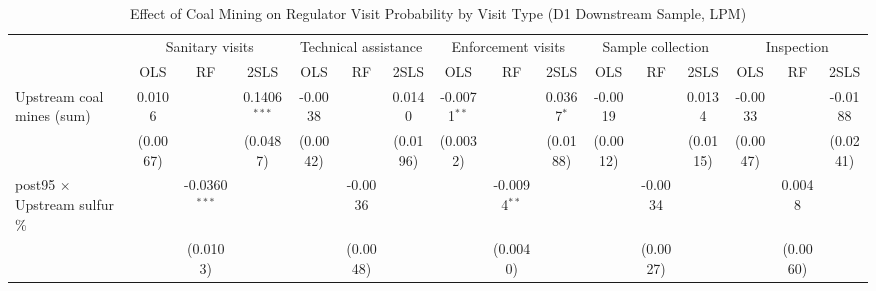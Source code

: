 
\begin{table}[htbp]
   
   \caption{\label{tab:h2_snsv_d12} Effect of Coal Mining on Regulator Visit Probability by Visit Type (D1 Downstream Sample, LPM)}
   \bigskip
   
   \centering
   
   \begin{adjustbox}{width = \textwidth, center}
      
      
      \begin{tabular}{lccccccccccccccc}
         \toprule
         
          & \multicolumn{3}{c}{Sanitary visits} & \multicolumn{3}{c}{Technical assistance} & \multicolumn{3}{c}{Enforcement visits} & \multicolumn{3}{c}{Sample collection} & \multicolumn{3}{c}{Inspection}\\
         
                                                                  & OLS           & RF              & 2SLS           & OLS           & RF            & 2SLS          & OLS            & RF             & 2SLS          & OLS           & RF            & 2SLS          & OLS           & RF            & 2SLS\\  
         
         \midrule 
         Upstream coal mines (sum)                                & 0.0106        &                 & 0.1406$^{***}$ & -0.0038       &               & 0.0140        & -0.0071$^{**}$ &                & 0.0367$^{*}$  & -0.0019       &               & 0.0134        & -0.0033       &               & -0.0188\\   
                                                                  & (0.0067)      &                 & (0.0487)       & (0.0042)      &               & (0.0196)      & (0.0032)       &                & (0.0188)      & (0.0012)      &               & (0.0115)      & (0.0047)      &               & (0.0241)\\   
         post95 $\times$ Upstream sulfur \%                       &               & -0.0360$^{***}$ &                &               & -0.0036       &               &                & -0.0094$^{**}$ &               &               & -0.0034       &               &               & 0.0048        &   \\   
                                                                  &               & (0.0103)        &                &               & (0.0048)      &               &                & (0.0040)       &               &               & (0.0027)      &               &               & (0.0060)      &   \\   
         

\end{tabular}
\end{adjustbox}
\end{table}
